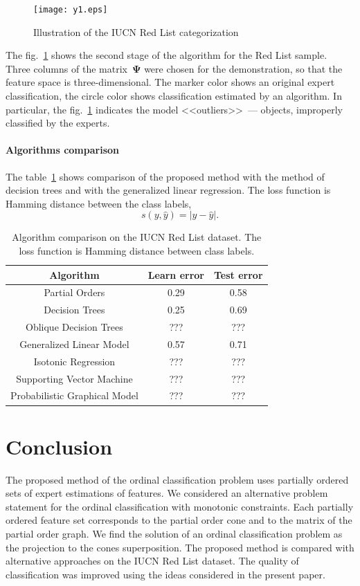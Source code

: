 \documentclass[12pt,preprint]{elsarticle}
\newcommand{\bPsi}{\boldsymbol{\Psi}}
\begin{document}
\begin{figure}[h]
\begin{center}
\texttt{[image: y1.eps]}
\caption{Illustration of the IUCN Red List categorization}
\label{figClass}
\end{center}
\end{figure}
The fig.~\ref{figClass} shows the second stage of the algorithm for the Red List sample. Three columns of the matrix~$\bPsi$ were chosen for the demonstration, so that the feature space is three-dimensional. The marker color shows an original expert classification, the circle color shows classification estimated by an algorithm. In particular, the fig.~\ref{figClass} indicates the model <<outliers>>~--- objects, improperly classified by the experts.
\paragraph{Algorithms comparison}
The table~\ref{tab:AlgComparison} shows comparison of the proposed method with the method of decision trees and with the generalized linear regression. The loss function is Hamming distance between the class labels,
\[
s(y,\hat{y})=|y-\hat{y}|.
\]

\begin{table}[h]
\centering
\caption{Algorithm comparison on the IUCN Red List dataset. The loss function is Hamming distance between class labels.}
\begin{tabular}{|c|c|c|}
  \hline
  Algorithm & Learn error & Test error \\
  \hline
  Partial Orders & 0.29 & 0.58 \\
  \hline
  Decision Trees & 0.25 & 0.69 \\
  \hline
  Oblique Decision Trees & ??? & ??? \\
  \hline
  Generalized Linear Model & 0.57 & 0.71 \\
  \hline
  Isotonic Regression & ??? & ??? \\
  \hline
  Supporting Vector Machine & ??? & ??? \\
  \hline
  Probabilistic Graphical Model & ??? & ??? \\
  \hline
\end{tabular}
\label{tab:AlgComparison}
\end{table}

\section{Conclusion}
The proposed method of the ordinal classification problem uses partially ordered sets of expert estimations of features. We considered an alternative problem statement for the ordinal classification with monotonic constraints. Each partially ordered feature set corresponds to the partial order cone and to the matrix of the partial order graph. We find the solution of an ordinal classification problem as the projection to the cones superposition. The proposed method is compared with alternative approaches on the IUCN Red List dataset. The quality of classification was improved using the ideas considered in the present paper.



\end{document}
